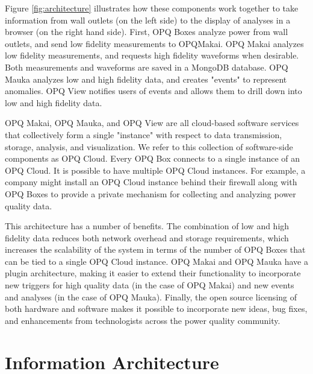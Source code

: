 Figure \ref{fig:architecture} illustrates how these components work together to take information from wall outlets (on the left side) to the display of analyses in a browser (on the right hand side).  First, OPQ Boxes analyze power from wall outlets, and send low fidelity measurements to OPQMakai. OPQ Makai analyzes low fidelity measurements, and requests high fidelity waveforms when desirable. Both measurements and waveforms are saved in a MongoDB database. OPQ Mauka analyzes low and high fidelity data, and creates "events" to represent anomalies. OPQ View notifies users of events and allows them to drill down into low and high fidelity data.

OPQ Makai, OPQ Mauka, and OPQ View are all cloud-based software services that collectively form a single "instance" with respect to data transmission, storage, analysis, and visualization. We refer to this collection of software-side components as OPQ Cloud. Every OPQ Box connects to a single instance of an OPQ Cloud. It is possible to have multiple OPQ Cloud instances. For example, a company might install an OPQ Cloud instance behind their firewall along with OPQ Boxes to provide a private mechanism for collecting and analyzing power quality data.

This architecture has a number of benefits. The combination of low and high fidelity data reduces both network overhead and storage requirements, which increases the scalability of the system in terms of the number of OPQ Boxes that can be tied to a single OPQ Cloud instance. OPQ Makai and OPQ Mauka have a plugin architecture, making it easier to extend their functionality to incorporate new triggers for high quality data (in the case of OPQ Makai) and new events and analyses (in the case of OPQ Mauka). Finally, the open source licensing of both hardware and software makes it possible to incorporate new ideas, bug fixes, and enhancements from technologists across the power quality community.

\section{Information Architecture}
\label{sec:information-architecture}

